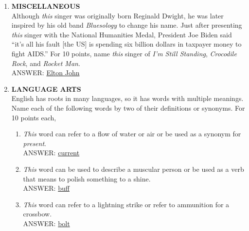 \documentclass{report}
\newcommand*{\backtrack}{\setcounter{enumi}{\numexpr\theenumi-1\relax}}
\begin{document}
\begin{enumerate}
    \item \textbf{MISCELLANEOUS} \\ Although \textit{this} singer was originally born Reginald Dwight, he was later inspired by his old band \textit{Bluesology} to change his name. Just after presenting \textit{this} singer with the National Humanities Medal, President Joe Biden said ``it's all his fault [the US] is spending six billion dollars in taxpayer money to fight AIDS.'' For 10 points, name \textit{this} singer of \textit{I'm Still Standing}, \textit{Crocodile Rock}, and \textit{Rocket Man}. \\ ANSWER: \underline{Elton John} \backtrack
    \item \textbf{LANGUAGE ARTS} \\ English has roots in many languages, so it has words with multiple meanings. Name each of the following words by two of their definitions or synonyms. For 10 points each,
    \begin{enumerate}[label=\Alph*]
        \item \textit{This} word can refer to a flow of water or air or be used as a synonym for \textit{present}. \\ ANSWER: \underline{current}
        \item \textit{This} word can be used to describe a muscular person or be used as a verb that means to polish something to a shine. \\ ANSWER: \underline{buff}
        \item \textit{This} word can refer to a lightning strike or refer to ammunition for a crossbow. \\ ANSWER: \underline{bolt}
    \end{enumerate}
    

\end{enumerate}
\end{document}

